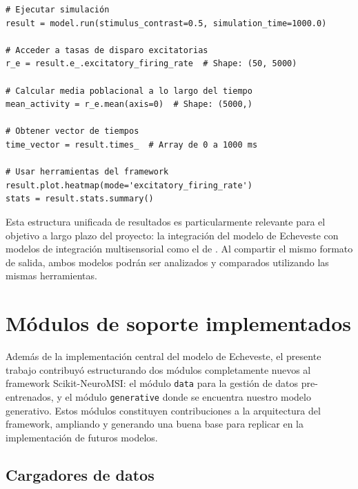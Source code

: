\begin{code}
\begin{verbatim}
# Ejecutar simulación
result = model.run(stimulus_contrast=0.5, simulation_time=1000.0)

# Acceder a tasas de disparo excitatorias
r_e = result.e_.excitatory_firing_rate  # Shape: (50, 5000)

# Calcular media poblacional a lo largo del tiempo
mean_activity = r_e.mean(axis=0)  # Shape: (5000,)

# Obtener vector de tiempos
time_vector = result.times_  # Array de 0 a 1000 ms

# Usar herramientas del framework
result.plot.heatmap(mode='excitatory_firing_rate')
stats = result.stats.summary()
\end{verbatim}
\caption{Acceso a los datos de simulación mediante el objeto \texttt{NDResult}.}
\label{code:ndresult_access}
\end{code}
\vspace{1.5em}

Esta estructura unificada de resultados es particularmente relevante para el objetivo a largo plazo del proyecto: la integración del modelo de Echeveste con modelos de integración multisensorial como el de \citet{cuppini2017biologically}. Al compartir el mismo formato de salida, ambos modelos podrán ser analizados y comparados utilizando las mismas herramientas.


\section{Módulos de soporte implementados}
\label{sec:impl_modulos_soporte}

Además de la implementación central del modelo de Echeveste, el presente trabajo contribuyó estructurando dos módulos completamente nuevos al framework Scikit-NeuroMSI: el módulo \texttt{data} para la gestión de datos pre-entrenados, y el módulo \texttt{generative} donde se encuentra nuestro modelo generativo. Estos módulos constituyen contribuciones a la arquitectura del framework, ampliando y generando una buena base para replicar en la implementación de futuros modelos.

\subsection{Cargadores de datos}
\label{subsec:impl_modulo_data}

